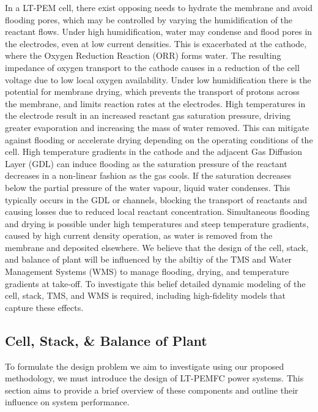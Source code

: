 In a LT-PEM cell, there exist opposing needs to hydrate the membrane and avoid flooding pores, which may be controlled by varying the humidification of the reactant flows.
Under high humidification, water may condense and flood pores in the electrodes, even at low current densities.
This is exacerbated at the cathode, where the Oxygen Reduction Reaction (ORR) forms water.
The resulting impedance of oxygen transport to the cathode causes in a reduction of the cell voltage due to low local oxygen availability.
Under low humidification there is the potential for membrane drying, which prevents the transport of protons across the membrane, and limits reaction rates at the electrodes.
High temperatures in the electrode result in an increased reactant gas saturation pressure, driving greater evaporation and increasing the mass of water removed.
This can mitigate against flooding or accelerate drying depending on the operating conditions of the cell.
High temperature gradients in the cathode and the adjacent Gas Diffusion Layer (GDL) can induce flooding as the saturation pressure of the reactant decreases in a non-linear fashion as the gas cools.
If the saturation decreases below the partial pressure of the water vapour, liquid water condenses.
This typically occurs in the GDL or channels, blocking the transport of reactants and causing losses due to reduced local reactant concentration.
Simultaneous flooding and drying is possible under high temperatures and steep temperature gradients, caused by high current density operation, as water is removed from the membrane and deposited elsewhere.
We believe that the design of the cell, stack, and balance of plant will be influenced by the abiltiy of the TMS and Water Management Systems (WMS) to manage flooding, drying, and temperature gradients at take-off.
To investigate this belief detailed dynamic modeling of the cell, stack, TMS, and WMS is required, including high-fidelity models that capture these effects.

\subsection{Cell, Stack, \& Balance of Plant} \label{sec:design}
To formulate the design problem we aim to investigate using our proposed methodology, we must introduce the design of LT-PEMFC power systems. This section aims to provide a brief overview of these components and outline their influence on system performance.

